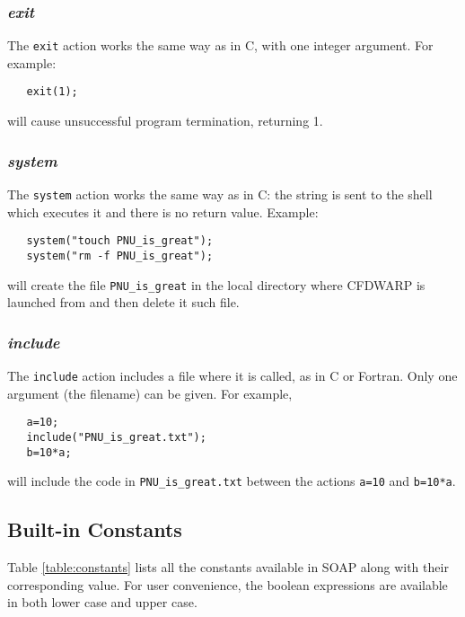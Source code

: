 \documentclass{warpdoc}
\begin{document}
\subsubsection{\emph{exit}}

The \verb|exit| action works the same way as in C, with one integer
argument. For example:
%
\begin{verbatim}
   exit(1);
\end{verbatim}
%
will cause unsuccessful program termination, returning 1.


\subsubsection{\emph{system}}

The \verb|system| action works the same way as in C: the string is sent to
the shell which executes it and there is no return value. Example:
%
\begin{verbatim}
   system("touch PNU_is_great");
   system("rm -f PNU_is_great");
\end{verbatim}
%
will create the file \verb|PNU_is_great| in the local directory where CFDWARP is launched from and then delete it such file. 


\subsubsection{\emph{include}}

The \verb|include| action includes a file where it is called, as in
C or Fortran. Only one argument (the filename) can be given. For example,
%
\begin{verbatim}
   a=10;
   include("PNU_is_great.txt");
   b=10*a;
\end{verbatim}
%
will include the code in \verb|PNU_is_great.txt|
between the actions \verb|a=10| and \verb|b=10*a|.


\subsection{Built-in Constants}

Table \ref{table:constants} lists all the constants available in SOAP
along with their corresponding value.
For user convenience, the boolean expressions are available in
both lower case and upper case.
\end{document}
